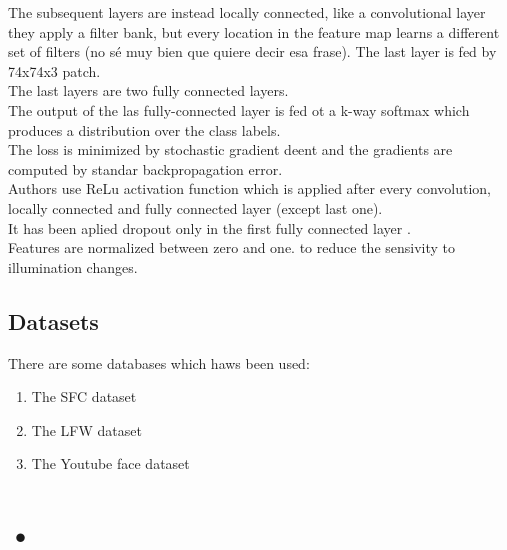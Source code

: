 \documentclass[a4paper]{article}
\begin{document}
The subsequent layers are instead locally connected, like a convolutional layer they apply a filter bank, but every location in the feature map learns a different set of filters (no sé muy bien que quiere decir esa frase). The last layer is fed by 74x74x3 patch.\\

The last layers are two fully connected layers.\\

The output of the las fully-connected layer is fed ot a k-way softmax which produces a distribution over the class labels.\\

The loss is minimized by stochastic gradient deent and the gradients are computed by standar backpropagation error.\\

Authors use ReLu activation function which is applied after every  convolution, locally connected and fully connected layer (except last one).\\

It has been aplied dropout only in the first fully connected layer .\\

Features are normalized between zero and one. to reduce the sensivity to illumination changes.

\subsection{Datasets}
There are some databases which haws been used:

\begin{enumerate}
\item The SFC dataset
\item The LFW dataset
\item The Youtube face dataset

\end{enumerate}


\section{•}
\end{document}
